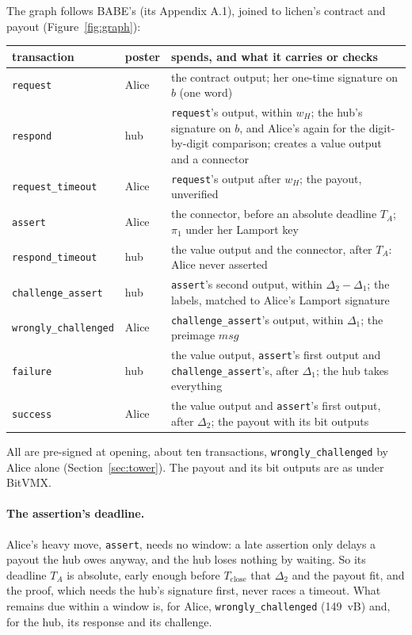 \documentclass[11pt]{article}
\newcommand{\Tc}{T_{\mathrm{close}}}
\newcommand{\tx}[1]{\texttt{#1}}
\begin{document}
The graph follows BABE's (its Appendix A.1), joined to lichen's contract
and payout (Figure~\ref{fig:graph}):
\begin{center}
\small
\begin{tabularx}{\linewidth}{>{\raggedright\arraybackslash}p{30mm}p{12mm}L}
\toprule
transaction & poster & spends, and what it carries or checks \\
\midrule
\tx{request} & Alice & the contract output; her one-time signature on $b$ (one word) \\
\tx{respond} & hub & \tx{request}'s output, within $w_H$; the hub's signature on $b$, and Alice's again for the digit-by-digit comparison; creates a value output and a connector \\
\tx{request\_timeout} & Alice & \tx{request}'s output after $w_H$; the payout, unverified \\
\tx{assert} & Alice & the connector, before an absolute deadline $T_A$; $\pi_1$ under her Lamport key \\
\tx{respond\_timeout} & hub & the value output and the connector, after $T_A$: Alice never asserted \\
\tx{challenge\_assert} & hub & \tx{assert}'s second output, within $\Delta_2 - \Delta_1$; the labels, matched to Alice's Lamport signature \\
\tx{wrongly\_challenged} & Alice & \tx{challenge\_assert}'s output, within $\Delta_1$; the preimage $\mathit{msg}$ \\
\tx{failure} & hub & the value output, \tx{assert}'s first output and \tx{challenge\_assert}'s, after $\Delta_1$; the hub takes everything \\
\tx{success} & Alice & the value output and \tx{assert}'s first output, after $\Delta_2$; the payout with its bit outputs \\
\bottomrule
\end{tabularx}
\end{center}
All are pre-signed at opening, about ten transactions,
\tx{wrongly\_challenged} by Alice alone (Section~\ref{sec:tower}). The payout and its bit outputs are as under BitVMX.

\paragraph{The assertion's deadline.} Alice's heavy move, \tx{assert},
needs no window: a late assertion only delays a payout the hub owes
anyway, and the hub loses nothing by waiting. So its deadline $T_A$ is
absolute, early enough before $\Tc$ that $\Delta_2$ and the payout fit,
and the proof, which needs the hub's signature first, never races a
timeout. What remains due within a window is, for Alice,
\tx{wrongly\_challenged} (149~vB) and, for the hub, its response and its
challenge.
\end{document}
